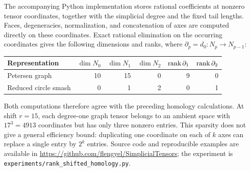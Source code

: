 The accompanying Python implementation stores rational coefficients at
nonzero tensor coordinates, together with the simplicial degree and the
fixed tail lengths. Faces, degeneracies, normalization, and concatenation
of axes are computed directly on these coordinates. Exact rational
elimination on the occurring coordinates gives the following dimensions
and ranks, where $\partial_p=d_0:N_p\to N_{p-1}$:
\begin{center}
\begin{tabular}{lrrrrr}
\hline
Representation & $\dim N_0$ & $\dim N_1$ & $\dim N_2$
 & $\operatorname{rank}\partial_1$ & $\operatorname{rank}\partial_2$\\
\hline
Petersen graph & 10 & 15 & 0 & 9 & 0\\
Reduced circle smash & 0 & 1 & 2 & 0 & 1\\
\hline
\end{tabular}
\end{center}
Both computations therefore agree with the preceding homology
calculations. At shift $r=15$, each degree-one graph tensor belongs to an
ambient space with $17^3=4913$ coordinates but has only three nonzero
entries. This sparsity does not give a general efficiency bound:
duplicating one coordinate on each of $k$ axes can replace a single entry
by $2^k$ entries. Source code and reproducible examples are available in
\url{https://github.com/flengyel/SimplicialTensors}; the experiment is
\texttt{experiments/rank\_shifted\_homology.py}.
